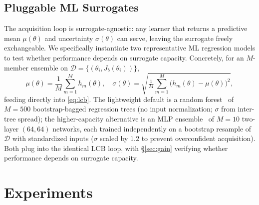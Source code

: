 \documentclass[conference]{IEEEtran}
\begin{document}
\subsection{Pluggable ML Surrogates}
\label{sec:surrogate}
The acquisition loop is surrogate-agnostic: any learner that returns a predictive mean $\mu(\theta)$ and uncertainty $\sigma(\theta)$ can serve, leaving the surrogate freely exchangeable. We specifically instantiate two representative ML regression models to test whether performance depends on surrogate capacity. Concretely, for an $M$-member ensemble on $\mathcal{D}{=}\{(\theta_i,J_b(\theta_i))\}$,
\begin{equation}
  \mu(\theta)=\frac{1}{M}\sum_{m=1}^{M}h_m(\theta),\quad
  \sigma(\theta)=\sqrt{\tfrac{1}{M}\sum_{m=1}^{M}\!\bigl(h_m(\theta)-\mu(\theta)\bigr)^{2}},
  \label{eq:ensemble}
\end{equation}
feeding directly into \eqref{eq:lcb}. The lightweight default is a random forest~\cite{ref_rf} of $M{=}500$ bootstrap-bagged regression trees (no input normalization; $\sigma$ from inter-tree spread); the higher-capacity alternative is an MLP ensemble~\cite{ref_ensemble} of $M{=}10$ two-layer $(64,64)$ networks, each trained independently on a bootstrap resample of $\mathcal{D}$ with standardized inputs ($\sigma$ scaled by $1.2$ to prevent overconfident acquisition). Both plug into the identical LCB loop, with \S\ref{sec:gain} verifying whether performance depends on surrogate capacity.

\section{Experiments}
\label{sec:experiments}
\end{document}
